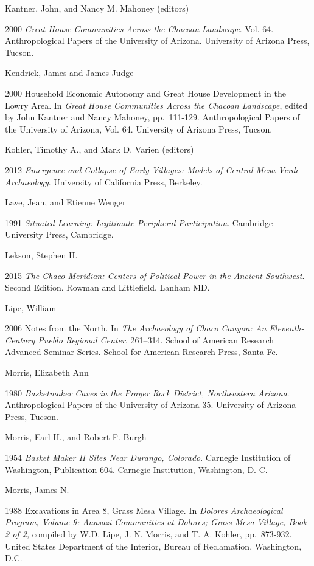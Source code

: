 \documentclass[
  12pt,
]{krantz}
\begin{document}
Kantner, John, and Nancy M. Mahoney (editors)

2000 \emph{Great House Communities Across the Chacoan Landscape}. Vol. 64.
Anthropological Papers of the University of Arizona. University of
Arizona Press, Tucson.

Kendrick, James and James Judge

2000 Household Economic Autonomy and Great House Development in the
Lowry Area. In \emph{Great House Communities Across the Chacoan Landscape},
edited by John Kantner and Nancy Mahoney, pp.~111-129. Anthropological
Papers of the University of Arizona, Vol. 64. University of Arizona
Press, Tucson.

Kohler, Timothy A., and Mark D. Varien (editors)

2012 \emph{Emergence and Collapse of Early Villages: Models of Central Mesa
Verde Archaeology}. University of California Press, Berkeley.

Lave, Jean, and Etienne Wenger

1991 \emph{Situated Learning: Legitimate Peripheral Participation}. Cambridge
University Press, Cambridge.

Lekson, Stephen H.

2015 \emph{The Chaco Meridian: Centers of Political Power in the Ancient
Southwest}. Second Edition. Rowman and Littlefield, Lanham MD.

Lipe, William

2006 Notes from the North. In \emph{The Archaeology of Chaco Canyon: An
Eleventh-Century Pueblo Regional Center}, 261--314. School of American
Research Advanced Seminar Series. School for American Research Press,
Santa Fe.

Morris, Elizabeth Ann

1980 \emph{Basketmaker Caves in the Prayer Rock District, Northeastern
Arizona}. Anthropological Papers of the University of Arizona 35.
University of Arizona Press, Tucson.

Morris, Earl H., and Robert F. Burgh

1954 \emph{Basket Maker II Sites Near Durango, Colorado}. Carnegie
Institution of Washington, Publication 604. Carnegie Institution,
Washington, D. C.

Morris, James N.

1988 Excavations in Area 8, Grass Mesa Village. In \emph{Dolores
Archaeological Program, Volume 9: Anasazi Communities at Dolores; Grass
Mesa Village, Book 2 of 2,} compiled by W.D. Lipe, J. N. Morris, and T.
A. Kohler, pp.~873-932. United States Department of the Interior, Bureau
of Reclamation, Washington, D.C.
\end{document}
